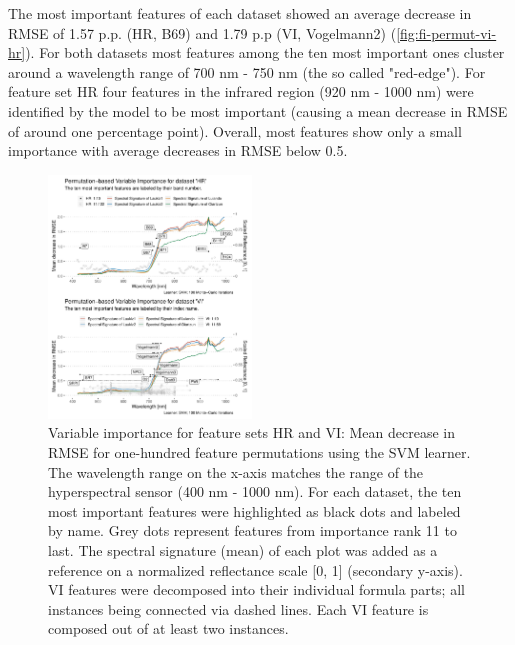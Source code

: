 \documentclass[letterpaper, peerreview]{IEEEtran}
\begin{document}

The most important features of each dataset showed an average decrease in RMSE of 1.57 p.p. (HR, B69) and 1.79 p.p (VI, Vogelmann2) (\autoref{fig:fi-permut-vi-hr}).
For both datasets most features among the ten most important ones cluster around a wavelength range of 700 nm - 750 nm (the so called "red-edge").
For feature set HR four features in the infrared region (920 nm - 1000 nm) were identified by the model to be most important (causing a mean decrease in RMSE of around one percentage point).
Overall, most features show only a small importance with average decreases in RMSE below 0.5.

\begin{figure} [t!]
	\centering
	\begin{center}
		\includegraphics[width=0.48\textwidth] {fi-permut-vi-hr-1.pdf}
		\caption{Variable importance for feature sets HR and VI: Mean decrease in RMSE for one-hundred feature permutations using the SVM learner. The wavelength range on the x-axis matches the range of the hyperspectral sensor (400 nm - 1000 nm). For each dataset, the ten most important features were highlighted as black dots and labeled by name. Grey dots represent features from importance rank 11 to last. The spectral signature (mean) of each plot was added as a reference on a normalized reflectance scale [0, 1] (secondary y-axis). VI features were decomposed into their individual formula parts; all instances being connected via dashed lines. Each VI feature is composed out of at least two instances.}\label{fig:fi-permut-vi-hr}
	\end{center}
\end{figure}
\end{document}
